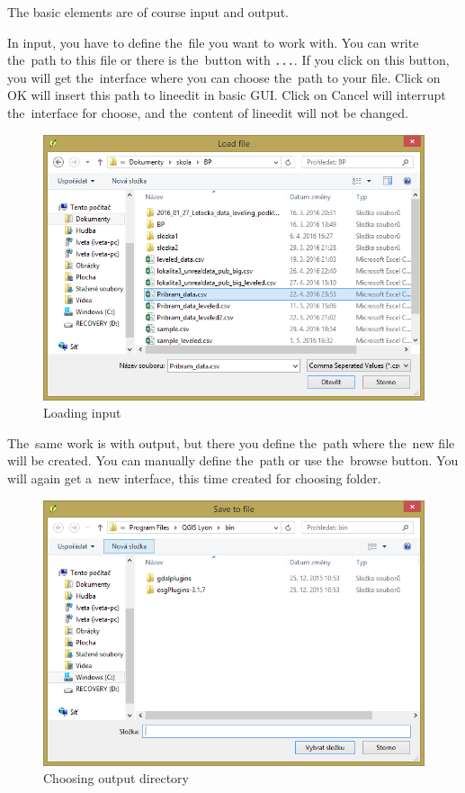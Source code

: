 The basic elements are of course input and output. 

In input, you have to define the~file you want to work with. You can write the~path to this file or
there is the~button with {\tt ...}. If you click on this button, you will get the~interface where
you can choose the~path to your file. Click on OK will insert this path to lineedit in basic GUI. Click
on Cancel will interrupt the~interface for choose, and the~content of lineedit will not be changed. 

  \begin{figure}[H]
   \centering
	\includegraphics[scale=0.75]{./pictures/input.png}
	\caption[Loading input]{Loading input}
      \label{fig:input}
  \end{figure}

The~same work is with output, but there you define the~path where the~new file will be created.
You can manually define the~path or use the~browse button. You will again get a~new interface, this
time created for choosing folder. 

  \begin{figure}[H]
   \centering
	\includegraphics[scale=0.75]{./pictures/output.png}
	\caption[Choosing output directory]{Choosing output directory}
      \label{fig:output}
  \end{figure}

